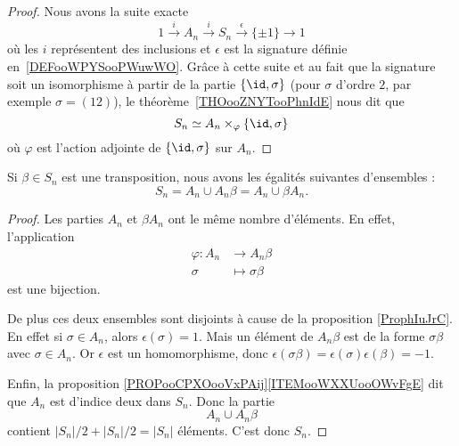\begin{proof}
	Nous avons la suite exacte
	\begin{equation}
		1\stackrel{i}{\longrightarrow}A_n\stackrel{i}{\longrightarrow}S_n\stackrel{\epsilon}{\longrightarrow}\{ \pm 1 \}\longrightarrow 1
	\end{equation}
	où les \( i\) représentent des inclusions et \( \epsilon\) est la signature définie en~\ref{DEFooWPYSooPWuwWO}. Grâce à cette suite et au fait que la signature soit un isomorphisme à partir de la partie \( \{ \id,\sigma \}\) (pour \( \sigma\) d'ordre \( 2\), par exemple \( \sigma=(12)\)), le théorème~\ref{THOooZNYTooPhnIdE} nous dit que
	\begin{equation}
		S_n\simeq A_n\times_{\varphi}\{ \id,\sigma \}
	\end{equation}
	où \( \varphi\) est l'action adjointe de \( \{ \id,\sigma \}\) sur \( A_n\).
\end{proof}

\begin{proposition}     \label{PROPooZOWBooIMxxlj}
	Si \( \beta\in S_n\) est une transposition, nous avons les égalités suivantes d'ensembles :
	\begin{equation}
		S_n=A_n\cup A_n\beta=A_n\cup \beta A_n.
	\end{equation}
\end{proposition}

\begin{proof}
	Les parties \( A_n\) et \( \beta A_n\) ont le même nombre d'éléments. En effet, l'application
	\begin{equation}
		\begin{aligned}
			\varphi\colon A_n & \to A_n\beta        \\
			\sigma            & \mapsto \sigma\beta
		\end{aligned}
	\end{equation}
	est une bijection.

	De plus ces deux ensembles sont disjoints à cause de la proposition \ref{ProphIuJrC}. En effet si \( \sigma\in A_n\), alors \( \epsilon(\sigma)=1\). Mais un élément de \( A_n\beta\) est de la forme \( \sigma\beta\) avec \( \sigma\in A_n\). Or \( \epsilon\) est un homomorphisme, donc \( \epsilon(\sigma\beta)=\epsilon(\sigma)\epsilon(\beta)=-1\).

	Enfin, la proposition \ref{PROPooCPXOooVxPAij}\ref{ITEMooWXXUooOWvFgE} dit que \( A_n\) est d'indice deux dans \( S_n\). Donc la partie
	\begin{equation}
		A_n\cup A_n\beta
	\end{equation}
	contient \( | S_n |/2+| S_n |/2=| S_n |\) éléments. C'est donc \( S_n\).
\end{proof}

